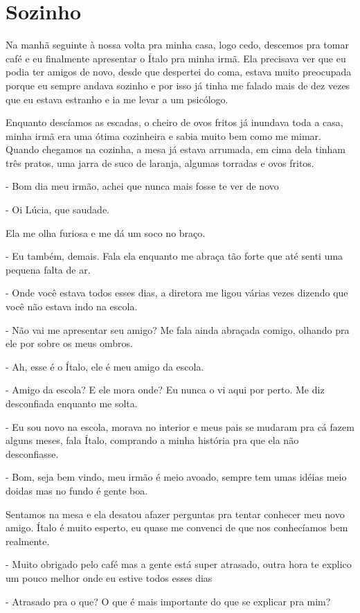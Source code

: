 \chapter{Sozinho}
Na manhã seguinte à nossa volta pra minha casa, logo cedo, descemos pra tomar café e eu finalmente apresentar o Ítalo pra minha irmã. Ela precisava ver que eu podia ter amigos de novo, desde que despertei do coma, estava muito preocupada porque eu sempre andava sozinho e por isso já tinha me falado mais de dez vezes que eu estava estranho e ia me levar a um psicólogo.

Enquanto descíamos as escadas, o cheiro de ovos fritos já inundava toda a casa, minha irmã era uma ótima cozinheira e sabia muito bem como me mimar. Quando chegamos na cozinha, a mesa já estava arrumada, em cima dela tinham três pratos, uma jarra de suco de laranja, algumas torradas e ovos fritos.

- Bom dia meu irmão, achei que nunca mais fosse te ver de novo

- Oi Lúcia, que saudade.

Ela me olha furiosa e me dá um soco no braço.

- Eu também, demais. Fala ela enquanto me abraça tão forte que até senti uma pequena falta de ar.

- Onde você estava todos esses dias, a diretora me ligou várias vezes dizendo que você não estava indo na escola.

- Não vai me apresentar seu amigo? Me fala ainda abraçada comigo, olhando pra ele por sobre os meus ombros.

- Ah, esse é o Ítalo, ele é meu amigo da escola.

- Amigo da escola? E ele mora onde? Eu nunca o vi aqui por perto. Me diz desconfiada enquanto me solta.

- Eu sou novo na escola, morava no interior e meus pais se mudaram pra cá fazem alguns meses, fala Ítalo, comprando a minha história pra que ela não desconfiasse.

- Bom, seja bem vindo, meu irmão é meio avoado, sempre tem umas idéias meio doidas mas no fundo é gente boa.

Sentamos na mesa e ela desatou afazer perguntas pra tentar conhecer meu novo amigo. Ítalo é muito esperto, eu quase me convenci de que nos conhecíamos bem realmente.

- Muito obrigado pelo café mas a gente está super atrasado, outra hora te explico um pouco melhor onde eu estive todos esses dias

- Atrasado pra o que? O que é mais importante do que se explicar pra mim?

